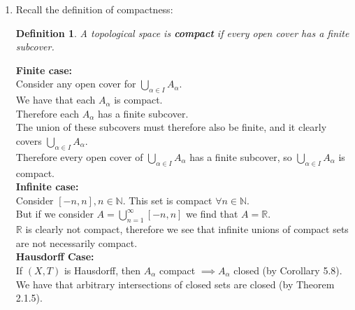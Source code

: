 \documentclass{article}
\newcommand{\R}{\mathbb{R}}
\newcommand{\N}{\mathbb{N}}
\renewcommand{\emptyset}{\varnothing}
\newtheorem{definition}[theorem]{Definition}
\theoremstyle{remark}
\begin{document}
\begin{enumerate}
\begin{proof}
              Finally, we need to ensure that $U \cap V = \emptyset$.\\
              Assume otherwise, that $\exists z \in U \cap V$.
              Then, this would mean that $(z,z) \in U \times V$.\\
              This can't occur ($A \cap \Delta =\emptyset)$, a contradiction.\\
              Therefore we have that $U \cap V = \emptyset$, as required.
          \end{proof}
    \item Recall the definition of compactness:
          \begin{framed}
              \setcounter{section}{5}
              \setcounter{theorem}{2}
              \begin{definition}
                  A topological space is \textbf{compact} if every open cover
                  has a finite subcover.
              \end{definition}
          \end{framed}
          \textbf{Finite case:}\\
          Consider any open cover for $\bigcup_{\alpha \in I} A_\alpha$.\\
          We have that each $A_\alpha$ is compact.\\
          Therefore each $A_\alpha$ has a finite subcover.\\
          The union of these subcovers must therefore also be finite,
          and it clearly covers $\bigcup_{\alpha \in I} A_\alpha$.\\
          Therefore every open cover of $\bigcup_{\alpha \in I} A_\alpha$
          has a finite subcover, so $\bigcup_{\alpha \in I} A_\alpha$ is compact.\\
          \textbf{Infinite case:}\\
          Consider $[-n,n], n \in \N$. This set is compact $\forall n \in \N$.\\
          But if we consider $A=\bigcup_{n=1}^\infty [-n,n]$ we find that $A=\R$.\\
          $\R$ is clearly not compact, therefore we see that infinite unions of
          compact sets are not necessarily compact.\\
          \textbf{Hausdorff Case:}\\
          If $(X,T)$ is Hausdorff,
          then $A_\alpha$ compact $\implies A_\alpha$ closed (by Corollary 5.8).\\
          We have that arbitrary intersections of closed sets are closed (by Theorem 2.1.5).\\

\end{enumerate}
\end{document}
